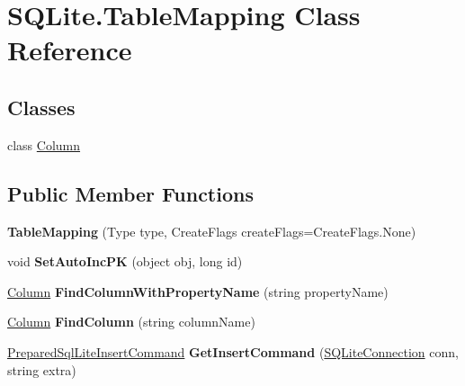 \hypertarget{classSQLite_1_1TableMapping}{}\section{S\+Q\+Lite.\+Table\+Mapping Class Reference}
\label{classSQLite_1_1TableMapping}
\subsection*{Classes}
\begin{DoxyCompactItemize}
\item 
class \hyperlink{classSQLite_1_1TableMapping_1_1Column}{Column}
\end{DoxyCompactItemize}
\subsection*{Public Member Functions}
\begin{DoxyCompactItemize}
\item 
\hypertarget{classSQLite_1_1TableMapping_a13e595aa07061915a33b2346497bd786}{}{\bfseries Table\+Mapping} (Type type, Create\+Flags create\+Flags=Create\+Flags.\+None)\label{classSQLite_1_1TableMapping_a13e595aa07061915a33b2346497bd786}

\item 
\hypertarget{classSQLite_1_1TableMapping_a02f2ce7280201f572621b75e106add15}{}void {\bfseries Set\+Auto\+Inc\+P\+K} (object obj, long id)\label{classSQLite_1_1TableMapping_a02f2ce7280201f572621b75e106add15}

\item 
\hypertarget{classSQLite_1_1TableMapping_ab71131c8ed49c2c5276a555af0d564f2}{}\hyperlink{classSQLite_1_1TableMapping_1_1Column}{Column} {\bfseries Find\+Column\+With\+Property\+Name} (string property\+Name)\label{classSQLite_1_1TableMapping_ab71131c8ed49c2c5276a555af0d564f2}

\item 
\hypertarget{classSQLite_1_1TableMapping_a1b6aca5cdaa9c0f8b6f5c1ecbb12affc}{}\hyperlink{classSQLite_1_1TableMapping_1_1Column}{Column} {\bfseries Find\+Column} (string column\+Name)\label{classSQLite_1_1TableMapping_a1b6aca5cdaa9c0f8b6f5c1ecbb12affc}

\item 
\hypertarget{classSQLite_1_1TableMapping_a858d8d3031d8fca47fbc24a0bc752177}{}\hyperlink{classSQLite_1_1PreparedSqlLiteInsertCommand}{Prepared\+Sql\+Lite\+Insert\+Command} {\bfseries Get\+Insert\+Command} (\hyperlink{classSQLite_1_1SQLiteConnection}{S\+Q\+Lite\+Connection} conn, string extra)\label{classSQLite_1_1TableMapping_a858d8d3031d8fca47fbc24a0bc752177}

\end{DoxyCompactItemize}
